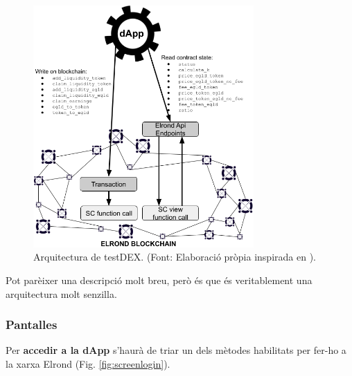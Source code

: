 \documentclass[11pt,a4paper]{article}
\begin{document}
\begin{figure}[h]
\includegraphics[width=0.75\textwidth]{architecture.png}
\centering
\caption{Arquitectura de testDEX. (Font: Elaboració pròpia inspirada en \cite{elrond2022}).}\label{fig:architecture}
\end{figure} 

Pot parèixer una descripció molt breu, però és que és veritablement una arquitectura molt senzilla.

\subsubsection{Pantalles}

Per \textbf{accedir a la dApp} s'haurà de triar un dels mètodes habilitats per fer-ho a la xarxa Elrond (Fig. \ref{fig:screenlogin}).
\end{document}
